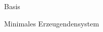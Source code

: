 \documentclass[class=article, crop=false]{standalone}
\begin{document}
\begin{zettel}{Basis}
\begin{flashcard}
    Minimales Erzeugendensystem

\end{flashcard}

\end{zettel}
\end{document}
